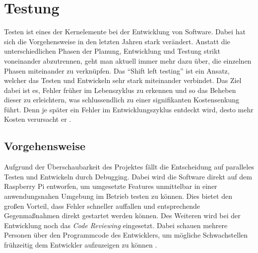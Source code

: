 
\chapter{Testung}
\begin{comment}
- Software testing during the software development
- Shift left testing
- quality assurance 
- detect defect as early as possible
- automatic testing
- goal of basic testing:
  - detect the obvious bugs that jump out immediately
  - otherwise: you get an expensive and unnexessary cycle of having to describe the problem of the devleoper,
  - who then has to repoduce it, debug it, solve it before trying again
- Basic steps for testing
- basic functionality testing
  - basic functions
- Code review
  - another pair of eyes
- static code analysis
  - anaylsis of your code through programs
  - coding standards
- unit testing
  - continous integration environment, unit should run on every commit
  - coverage goals
\end{comment}


Testen ist eines der Kernelemente bei der Entwicklung von Software. Dabei hat
sich die Vorgehensweise in den letzten Jahren stark verändert. Anstatt die
unterschiedlichen Phasen der Planung, Entwicklung und Testung strikt
voneinander abzutrennen, geht man aktuell immer mehr dazu über, die einzelnen
Phasen miteinander zu verknüpfen. \newline
Das \enquote{Shift left testing} ist ein Ansatz, welcher das Testen und
Entwickeln sehr stark miteinander verbindet. Das Ziel dabei ist es, Fehler
früher im Lebenszyklus zu erkennen und so das Beheben dieser zu erleichtern, was schlussendlich zu einer signifikanten Kostensenkung führt. Denn
je später ein Fehler im Entwicklungszyklus entdeckt wird, desto mehr Kosten
verursacht er \autocite{isaacs_2019}. \hfill \break


\section{Vorgehensweise}
Aufgrund der Überschaubarkeit des Projektes fällt die Entscheidung auf
paralleles Testen und Entwickeln durch Debugging. Dabei wird die Software
direkt auf dem Raspberry Pi entworfen, um umgesetzte Features unmittelbar in
einer anwendungsnahen Umgebung im Betrieb testen zu können. Dies bietet den
großen Vorteil, dass Fehler schneller auffallen und entsprechende
Gegenmaßnahmen direkt gestartet werden können. \newline
Des Weiteren wird bei der Entwicklung noch das \textit{Code Reviewing}
eingesetzt. Dabei schauen mehrere Personen über den Programmcode des
Entwicklers, um mögliche Schwachstellen frühzeitig dem Entwickler aufzuzeigen
zu können \autocite{isaacs_2019}. 

